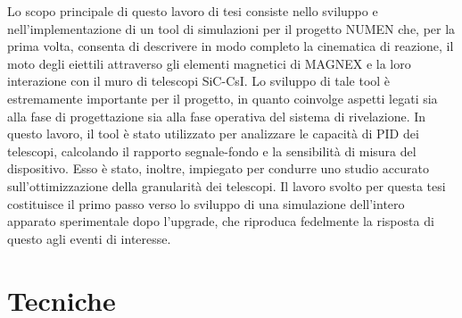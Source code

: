 \documentclass[10pt,foldmark,notumble]{leaflet}
\newcommand{\geant}{Geant4}
\begin{document}
Lo scopo principale di questo lavoro di tesi consiste nello sviluppo e nell'implementazione di un tool di simulazioni per il progetto NUMEN che, per la prima volta, consenta di descrivere in modo completo la cinematica di reazione, il moto degli eiettili attraverso gli elementi magnetici di MAGNEX e la loro interazione con il muro di telescopi SiC-CsI.
Lo sviluppo di tale tool è estremamente importante per il progetto, in quanto coinvolge aspetti legati sia alla fase di progettazione sia alla fase operativa del sistema di rivelazione.
In questo lavoro, il tool è stato utilizzato per analizzare le capacità di PID dei telescopi, calcolando il rapporto segnale-fondo e la sensibilità di misura del dispositivo.
Esso è stato, inoltre, impiegato per condurre uno studio accurato sull'ottimizzazione della granularità dei telescopi.
Il lavoro svolto per questa tesi costituisce il primo passo verso lo sviluppo di una simulazione dell'intero apparato sperimentale dopo l'upgrade, che riproduca fedelmente la risposta di questo agli eventi di interesse.






\section{Tecniche}
\end{document}
